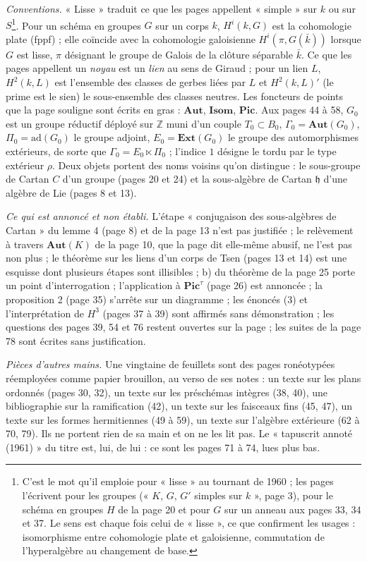 \documentclass[11pt,a4paper]{article}
\begin{document}
\emph{Conventions.} « Lisse » traduit ce que les pages appellent « simple » sur
$k$ ou sur $S$\footnote{C'est le mot qu'il emploie pour « lisse » au tournant
de 1960 ; les pages l'écrivent pour les groupes (« $K$, $G$, $G'$ simples sur
$k$ », page 3), pour le schéma en groupes $H$ de la page 20 et pour $G$ sur un
anneau aux pages 33, 34 et 37. Le sens est chaque fois celui de « lisse », ce
que confirment les usages : isomorphisme entre cohomologie plate et galoisienne,
commutation de l'hyperalgèbre au changement de base.}. Pour un schéma en groupes
$G$ sur un corps $k$, $H^i(k,G)$ est la cohomologie plate (fppf) ; elle coïncide
avec la cohomologie galoisienne $H^i(\pi, G(\bar k))$ lorsque $G$ est lisse, $\pi$
désignant le groupe de Galois de la clôture séparable $\bar k$. Ce que les
pages appellent un \emph{noyau} est un \emph{lien} au sens de Giraud ; pour un
lien $L$, $H^2(k,L)$ est l'ensemble des classes de gerbes liées par $L$ et
$H^2(k,L)'$ (le prime est le sien) le sous-ensemble des classes neutres. Les
foncteurs de points que la page souligne sont écrits en gras :
$\mathbf{Aut}$, $\mathbf{Isom}$, $\mathbf{Pic}$. Aux pages 44 à 58, $G_0$ est
un groupe réductif déployé sur $\mathbb{Z}$ muni d'un couple $T_0 \subset B_0$,
$\Gamma_0 = \mathbf{Aut}(G_0)$, $\Pi_0 = \mathrm{ad}(G_0)$ le groupe adjoint,
$E_0 = \mathbf{Ext}(G_0)$ le groupe des automorphismes extérieurs, de sorte que
$\Gamma_0 = E_0 \ltimes \Pi_0$ ; l'indice $1$ désigne le tordu par le type
extérieur $\rho$. Deux objets portent des noms voisins qu'on distingue : le
sous-groupe de Cartan $C$ d'un groupe (pages 20 et 24) et la sous-algèbre de
Cartan $\mathfrak{h}$ d'une algèbre de Lie (pages 8 et 13).

\emph{Ce qui est annoncé et non établi.} L'étape « conjugaison des
sous-algèbres de Cartan » du lemme 4 (page 8) et de la page 13 n'est pas
justifiée ; le relèvement à travers $\mathbf{Aut}(K)$ de la page 10, que la page
dit elle-même abusif, ne l'est pas non plus ; le théorème sur les liens d'un
corps de Tsen (pages 13 et 14) est
une esquisse dont plusieurs étapes sont illisibles ; b) du théorème de la page
25 porte un point d'interrogation ; l'application à $\mathbf{Pic}^{\tau}$
(page 26) est annoncée ; la proposition 2 (page 35) s'arrête sur un diagramme ;
les énoncés (3) et l'interprétation de $H^3$ (pages 37 à 39) sont affirmés sans
démonstration ; les questions des pages 39, 54 et 76 restent ouvertes sur la
page ; les suites de la page 78 sont écrites sans justification.

\emph{Pièces d'autres mains.} Une vingtaine de feuillets sont des pages
ronéotypées réemployées comme papier brouillon, au verso de ses notes : un
texte sur les plans ordonnés (pages 30, 32), un texte sur les préschémas
intègres (38, 40), une bibliographie sur la ramification (42), un texte sur les
faisceaux fins (45, 47), un texte sur les formes hermitiennes (49 à 59), un
texte sur l'algèbre extérieure (62 à 70, 79). Ils ne portent rien de sa main et
on ne les lit pas. Le « tapuscrit annoté (1961) » du titre est, lui, de lui :
ce sont les pages 71 à 74, lues plus bas.
\end{document}
